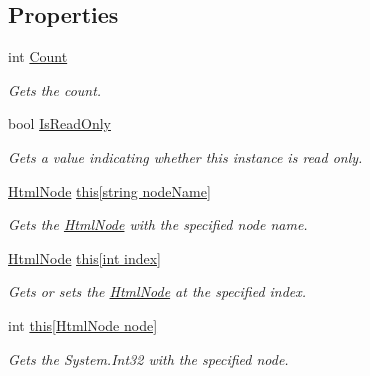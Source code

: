 \subsection*{Properties}
\begin{DoxyCompactItemize}
\item 
int \hyperlink{class_html_agility_pack_1_1_html_node_collection_a1cadc0dea140098ebd0fa154aff5756a}{Count}
\begin{DoxyCompactList}\small\item\em Gets the count. \end{DoxyCompactList}\item 
bool \hyperlink{class_html_agility_pack_1_1_html_node_collection_ac1b91d87ba873bfd722272b97eb24a41}{Is\+Read\+Only}
\begin{DoxyCompactList}\small\item\em Gets a value indicating whether this instance is read only. \end{DoxyCompactList}\item 
\hyperlink{class_html_agility_pack_1_1_html_node}{Html\+Node} \hyperlink{class_html_agility_pack_1_1_html_node_collection_a768bfd4cb14d7e0a84b0b85baa3687fb}{this\mbox{[}string node\+Name\mbox{]}}
\begin{DoxyCompactList}\small\item\em Gets the \hyperlink{class_html_agility_pack_1_1_html_node}{Html\+Node} with the specified node name. \end{DoxyCompactList}\item 
\hyperlink{class_html_agility_pack_1_1_html_node}{Html\+Node} \hyperlink{class_html_agility_pack_1_1_html_node_collection_a999ccc9db0cc0a9ed91c2a29a937b74d}{this\mbox{[}int index\mbox{]}}
\begin{DoxyCompactList}\small\item\em Gets or sets the \hyperlink{class_html_agility_pack_1_1_html_node}{Html\+Node} at the specified index. \end{DoxyCompactList}\item 
int \hyperlink{class_html_agility_pack_1_1_html_node_collection_a5f24c5fdf331d11c1137c5ce404b2551}{this\mbox{[}\+Html\+Node node\mbox{]}}
\begin{DoxyCompactList}\small\item\em Gets the System.\+Int32 with the specified node. \end{DoxyCompactList}\end{DoxyCompactItemize}



